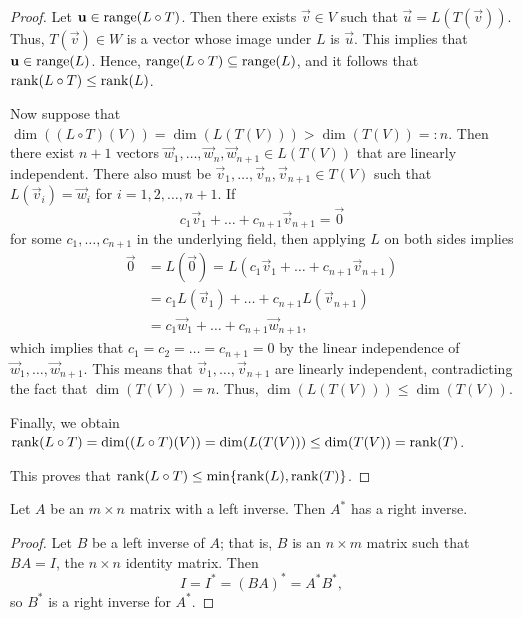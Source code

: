\documentclass{homework}
\begin{document}
	\begin{proof}
		Let $\mathbf{u} \in \mathrm{range}(L\circ T)$. Then there exists $\vec{v} \in V$ such that $\vec{u} = L(T(\vec{v}))$. Thus, $T(\vec{v}) \in W$ is a vector whose image under $L$ is $\vec{u}$. This implies that $\mathbf{u} \in \mathrm{range}(L)$. Hence, $\mathrm{range}(L\circ T) \subseteq \mathrm{range}(L)$, and it follows that $\mathrm{rank}(L\circ T) \le \mathrm{rank}(L)$.
		
		Now suppose that $\dim((L\circ T)(V)) = \dim(L(T(V))) > \dim(T(V)) =: n$. Then there exist $n+1$ vectors $\vec{w}_1, \dots, \vec{w}_n, \vec{w}_{n+1}\in L(T(V))$ that are linearly independent. There also must be $\vec{v}_1, \dots, \vec{v}_n, \vec{v}_{n+1} \in T(V)$ such that $L(\vec{v}_i) = \vec{w}_i$ for $i=1,2,\dots, n+1$. If
		\begin{equation*}
			c_1\vec{v}_1 + \dots + c_{n+1}\vec{v}_{n+1} = \vec{0}
		\end{equation*}
		for some $c_1, \dots, c_{n+1}$ in the underlying field, then applying $L$ on both sides implies
		\begin{equation*}
		\begin{aligned}
			\vec{0} &= L(\vec{0}) = L(c_1\vec{v}_1 + \dots + c_{n+1}\vec{v}_{n+1}) \\
			&= c_1L(\vec{v}_1) + \dots + c_{n+1}L(\vec{v}_{n+1}) \\
			&= c_1\vec{w}_1 + \dots +c_{n+1}\vec{w}_{n+1},
		\end{aligned}
		\end{equation*}
		which implies that $c_1 = c_2 = \dots = c_{n+1} = 0$ by the linear independence of $\vec{w}_1, \dots, \vec{w}_{n+1}$. This means that $\vec{v}_1, \dots, \vec{v}_{n+1}$ are linearly independent, contradicting the fact that $\dim(T(V)) = n$. Thus, $\dim(L(T(V))) \le \dim(T(V))$.
		
		Finally, we obtain $\mathrm{rank}(L\circ T) = \dim((L\circ T)(V)) = \dim(L(T(V))) \le \dim(T(V)) = \mathrm{rank}(T)$.
		
		This proves that $\mathrm{rank}(L \circ T) \le \min\{\mathrm{rank}(L), \mathrm{rank}(T)\}$.
	\end{proof}
	
	\question Let $A$ be an $m\times n$ matrix with a left inverse. Then $A^*$ has a right inverse.
	\begin{proof}
		Let $B$ be a left inverse of $A$; that is, $B$ is an $n \times m$ matrix such that $BA = I$, the $n\times n$ identity matrix. Then
		\begin{equation*}
			I = I^* = (BA)^* = A^*B^*,
		\end{equation*}
		so $B^*$ is a right inverse for $A^*$.
	\end{proof}
	
\end{document}
